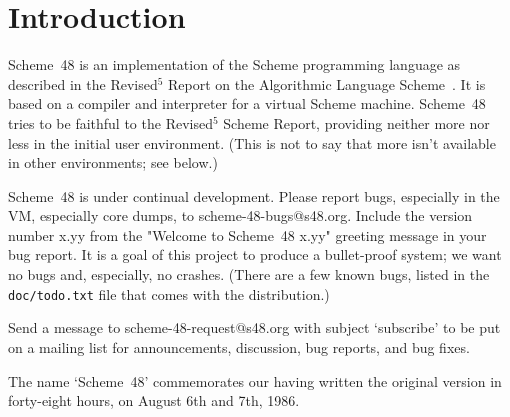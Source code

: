 
\chapter{Introduction}

Scheme~48 is an implementation of the Scheme programming language as
described in the Revised$^5$ Report on the Algorithmic Language
 Scheme~\cite{R5RS}.
It is based on a compiler and interpreter for a virtual Scheme
machine.  Scheme~48 tries to be faithful to the Revised$^5$ Scheme
Report, providing neither more nor less in the initial user
environment.  (This is not to say that more isn't available in other
environments; see below.)

Scheme~48 is under continual development.
Please report bugs, especially in the VM, especially core dumps, to
scheme-48-bugs@s48.org.  Include the version number x.yy
from the "Welcome to Scheme~48 x.yy" greeting message in your bug
report.  It is a goal of this project to produce a bullet-proof
system; we want no bugs and, especially, no crashes.  (There are a few
known bugs, listed in the {\tt doc/todo.txt} file that comes with the
distribution.)

Send a message to scheme-48-request@s48.org with subject `subscribe' to
 be put on a
mailing list for announcements, discussion, bug reports, and bug
fixes.

The name `Scheme~48' commemorates our having written the original version
 in forty-eight hours, on August 6th and 7th, 1986.

